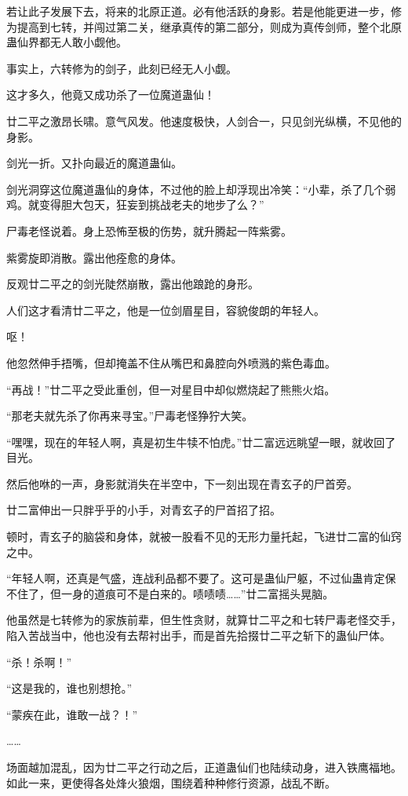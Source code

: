 \begin{this_body}
若让此子发展下去，将来的北原正道。必有他活跃的身影。若是他能更进一步，修为提高到七转，并闯过第二关，继承真传的第二部分，则成为真传剑师，整个北原蛊仙界都无人敢小觑他。

事实上，六转修为的剑子，此刻已经无人小觑。

这才多久，他竟又成功杀了一位魔道蛊仙！

廿二平之激昂长啸。意气风发。他速度极快，人剑合一，只见剑光纵横，不见他的身影。

剑光一折。又扑向最近的魔道蛊仙。

剑光洞穿这位魔道蛊仙的身体，不过他的脸上却浮现出冷笑：“小辈，杀了几个弱鸡。就变得胆大包天，狂妄到挑战老夫的地步了么？”

尸毒老怪说着。身上恐怖至极的伤势，就升腾起一阵紫雾。

紫雾旋即消散。露出他痊愈的身体。

反观廿二平之的剑光陡然崩散，露出他踉跄的身形。

人们这才看清廿二平之，他是一位剑眉星目，容貌俊朗的年轻人。

呕！

他忽然伸手捂嘴，但却掩盖不住从嘴巴和鼻腔向外喷溅的紫色毒血。

“再战！”廿二平之受此重创，但一对星目中却似燃烧起了熊熊火焰。

“那老夫就先杀了你再来寻宝。”尸毒老怪狰狞大笑。

“嘿嘿，现在的年轻人啊，真是初生牛犊不怕虎。”廿二富远远眺望一眼，就收回了目光。

然后他咻的一声，身影就消失在半空中，下一刻出现在青玄子的尸首旁。

廿二富伸出一只胖乎乎的小手，对青玄子的尸首招了招。

顿时，青玄子的脑袋和身体，就被一股看不见的无形力量托起，飞进廿二富的仙窍之中。

“年轻人啊，还真是气盛，连战利品都不要了。这可是蛊仙尸躯，不过仙蛊肯定保不住了，但一身的道痕可不是白来的。啧啧啧……”廿二富摇头晃脑。

他虽然是七转修为的家族前辈，但生性贪财，就算廿二平之和七转尸毒老怪交手，陷入苦战当中，他也没有去帮衬出手，而是首先拾掇廿二平之斩下的蛊仙尸体。

“杀！杀啊！”

“这是我的，谁也别想抢。”

“蒙疾在此，谁敢一战？！”

……

场面越加混乱，因为廿二平之行动之后，正道蛊仙们也陆续动身，进入铁鹰福地。如此一来，更使得各处烽火狼烟，围绕着种种修行资源，战乱不断。


\end{this_body}
